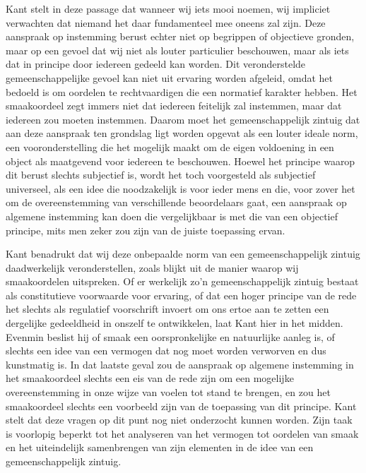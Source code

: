 \begin{mdframed}[leftmargin=0pt,rightmargin=0pt,backgroundcolor=blue!6,linecolor=white,innertopmargin=6pt,innerbottommargin=6pt]

Kant stelt in deze passage dat wanneer wij iets mooi noemen, wij impliciet verwachten dat niemand het daar fundamenteel mee oneens zal zijn. Deze aanspraak op instemming berust echter niet op begrippen of objectieve gronden, maar op een gevoel dat wij niet als louter particulier beschouwen, maar als iets dat in principe door iedereen gedeeld kan worden. Dit veronderstelde gemeenschappelijke gevoel kan niet uit ervaring worden afgeleid, omdat het bedoeld is om oordelen te rechtvaardigen die een normatief karakter hebben. Het smaakoordeel zegt immers niet dat iedereen feitelijk zal instemmen, maar dat iedereen zou moeten instemmen. Daarom moet het gemeenschappelijk zintuig dat aan deze aanspraak ten grondslag ligt worden opgevat als een louter ideale norm, een vooronderstelling die het mogelijk maakt om de eigen voldoening in een object als maatgevend voor iedereen te beschouwen. Hoewel het principe waarop dit berust slechts subjectief is, wordt het toch voorgesteld als subjectief universeel, als een idee die noodzakelijk is voor ieder mens en die, voor zover het om de overeenstemming van verschillende beoordelaars gaat, een aanspraak op algemene instemming kan doen die vergelijkbaar is met die van een objectief principe, mits men zeker zou zijn van de juiste toepassing ervan.

Kant benadrukt dat wij deze onbepaalde norm van een gemeenschappelijk zintuig daadwerkelijk veronderstellen, zoals blijkt uit de manier waarop wij smaakoordelen uitspreken. Of er werkelijk zo’n gemeenschappelijk zintuig bestaat als constitutieve voorwaarde voor ervaring, of dat een hoger principe van de rede het slechts als regulatief voorschrift invoert om ons ertoe aan te zetten een dergelijke gedeeldheid in onszelf te ontwikkelen, laat Kant hier in het midden. Evenmin beslist hij of smaak een oorspronkelijke en natuurlijke aanleg is, of slechts een idee van een vermogen dat nog moet worden verworven en dus kunstmatig is. In dat laatste geval zou de aanspraak op algemene instemming in het smaakoordeel slechts een eis van de rede zijn om een mogelijke overeenstemming in onze wijze van voelen tot stand te brengen, en zou het smaakoordeel slechts een voorbeeld zijn van de toepassing van dit principe. Kant stelt dat deze vragen op dit punt nog niet onderzocht kunnen worden. Zijn taak is voorlopig beperkt tot het analyseren van het vermogen tot oordelen van smaak en het uiteindelijk samenbrengen van zijn elementen in de idee van een gemeenschappelijk zintuig.


\end{mdframed}
